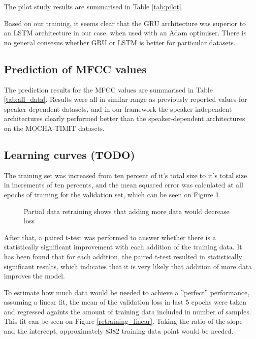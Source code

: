 \documentclass[a4paper]{article}
\begin{document}
The pilot study results are summarised in Table \ref{tab:pilot}.

Based on our training, it seems clear that the GRU architecture was superior to an LSTM
architecture in our case, when used with an Adam optimiser.
There is no general consesus whether GRU or LSTM is better for particular
datasets. \cite{Jozefowicz2015}

\subsection{Prediction of MFCC values}

The prediction results for the MFCC values are summarised in Table
\ref{tab:all_data}. Results were all in similar range as previously
reported values for speaker-dependent datasets, and in our framework
the speaker-independent architectures clearly performed better than the
speaker-dependent architectures on the MOCHA-TIMIT datasets.

\subsection{Learning curves (TODO)}

The training set was increased from ten percent of it's total size to it's
total size in increments of ten percents, and the mean squared error
was calculated at all epochs of training for the validation set, which
can be seen on Figure \ref{learning_curve}.

\begin{figure}[t]
  \begin{center}
    \scalebox{0.50}{}
    \caption{Partial data retraining shows that adding more data would
      decrease loss}
      \label{learning_curve}
\end{center}
\end{figure}


After that, a paired t-test was performed to answer whether there is
a statistically significant improvement with each addition of the training data.
It has been found that for each addition, the paired t-test resulted in statistically
significant results, which indicates that it is very likely that addition
of more data improves the model.

To estimate how much data would be needed to achieve a ''perfect'' performance,
assuming a linear fit, the mean of the validation loss in last 5 epochs
were taken and regressed againts the amount of training data included in
number of samples. This fit can be seen on Figure \ref{retraining_linear}.
Taking the ratio of the slope and the intercept, approximately 8382
training data point would be needed.
\end{document}
